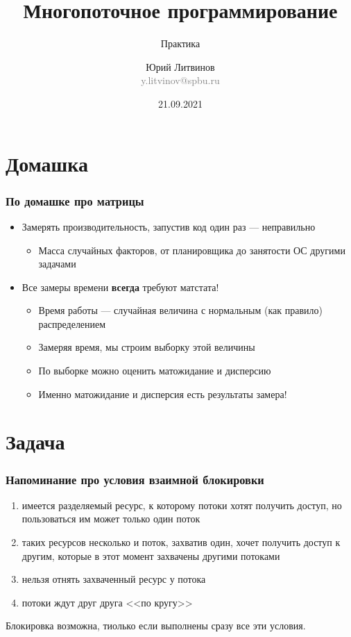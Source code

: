 \documentclass[xetex,mathserif,serif]{beamer}
\title{Многопоточное программирование}
\subtitle{Практика}
\author[Юрий Литвинов]{Юрий Литвинов\\\small{\textcolor{gray}{y.litvinov@spbu.ru}}}
\date{21.09.2021}
\begin{document}
    \frame{\titlepage}

    \section{Домашка}

    \begin{frame}
        \frametitle{По домашке про матрицы}
        \begin{itemize}
            \item Замерять производительность, запустив код один раз --- неправильно
            \begin{itemize}
                \item Масса случайных факторов, от планировщика до занятости ОС другими задачами
            \end{itemize}
            \item Все замеры времени \textbf{всегда} требуют матстата!
            \begin{itemize}
                \item Время работы --- случайная величина с нормальным (как правило) распределением
                \item Замеряя время, мы строим выборку этой величины
                \item По выборке можно оценить матожидание и дисперсию
                \item Именно матожидание и дисперсия есть результаты замера!
            \end{itemize}
        \end{itemize}
    \end{frame}

    \section{Задача}

    \begin{frame}
        \frametitle{Напоминание про условия взаимной блокировки}
        \begin{enumerate}
            \item имеется разделяемый ресурс, к которому потоки хотят получить доступ, но пользоваться им может только один поток
            \item таких ресурсов несколько и поток, захватив один, хочет получить доступ к другим, которые в этот момент захвачены другими потоками
            \item нельзя отнять захваченный ресурс у потока
            \item потоки ждут друг друга <<по кругу>>
        \end{enumerate}
        Блокировка возможна, тиолько если выполнены сразу все эти условия.
    \end{frame}
\end{document}
